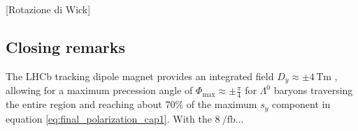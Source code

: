 [Rotazione di Wick]

\subsection{Closing remarks}

The LHCb tracking dipole magnet provides an integrated field $D_y \approx \pm 4 \,\si{\tesla\meter}$ \cite{LHCbDetectorPerformance}, allowing for a maximum precession angle of $\Phi_\text{max} \approx \pm \frac{\pi}{4}$ for $\Lambda^0$ baryons traversing the entire region and reaching about 70\% of the maximum $s_y$ component in equation \eqref{eq:final_polarization_cap1}. With the $8~\si{\per\femto\barn}$...

